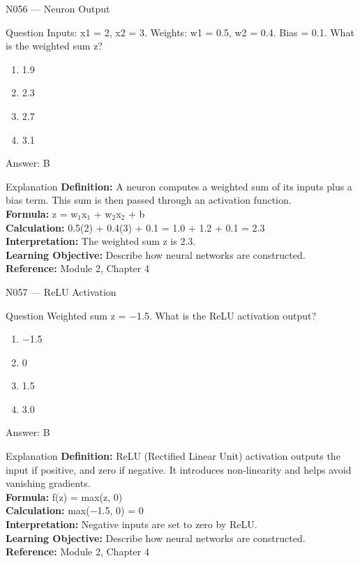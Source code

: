 \documentclass[aspectratio=169,8pt]{beamer}
\begin{document}
	\begin{frame}{N056 --- Neuron Output}
		\begin{block}{Question}
			Inputs: x1 = 2, x2 = 3. Weights: w1 = 0.5, w2 = 0.4. Bias = 0.1. What is the weighted sum z?
			\begin{enumerate}
				\item 1.9
				\item 2.3
				\item 2.7
				\item 3.1
			\end{enumerate}
		\end{block}
		\begin{exampleblock}{Answer: B}\end{exampleblock}
		\begin{block}{Explanation}
			\textbf{Definition:} A neuron computes a weighted sum of its inputs plus a bias term. This sum is then passed through an activation function.\\
			\textbf{Formula:} z = w$_{1}$x$_{1}$ + w$_{2}$x$_{2}$ + b\\
			\textbf{Calculation:} 0.5(2) + 0.4(3) + 0.1 = 1.0 + 1.2 + 0.1 = 2.3\\
			\textbf{Interpretation:} The weighted sum z is 2.3.\\
			\textbf{Learning Objective:} Describe how neural networks are constructed.\\
			\textbf{Reference:} Module 2, Chapter 4
		\end{block}
	\end{frame}
	
	\begin{frame}{N057 --- ReLU Activation}
		\begin{block}{Question}
			Weighted sum z = $-$1.5. What is the ReLU activation output?
			\begin{enumerate}
				\item $-$1.5
				\item 0
				\item 1.5
				\item 3.0
			\end{enumerate}
		\end{block}
		\begin{exampleblock}{Answer: B}\end{exampleblock}
		\begin{block}{Explanation}
			\textbf{Definition:} ReLU (Rectified Linear Unit) activation outputs the input if positive, and zero if negative. It introduces non-linearity and helps avoid vanishing gradients.\\
			\textbf{Formula:} f(z) = max(z, 0)\\
			\textbf{Calculation:} max($-$1.5, 0) = 0\\
			\textbf{Interpretation:} Negative inputs are set to zero by ReLU.\\
			\textbf{Learning Objective:} Describe how neural networks are constructed.\\
			\textbf{Reference:} Module 2, Chapter 4
		\end{block}
	\end{frame}
	
\end{document}
